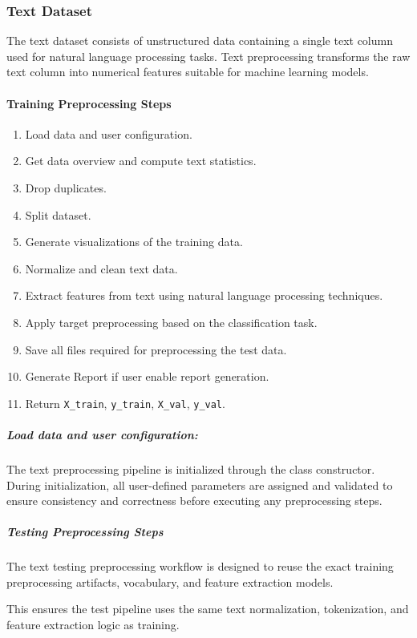 \subsubsection{Text Dataset}

The text dataset consists of unstructured data containing a single text column used for natural language processing tasks. Text preprocessing transforms the raw text column into numerical features suitable for machine learning models.
\vspace{0.5cm}

\paragraph{Training Preprocessing Steps}

\begin{enumerate}
  \item Load data and user configuration.
  \item Get data overview and compute text statistics.
  \item Drop duplicates.
  \item Split dataset.
  \item Generate visualizations of the training data.
  \item Normalize and clean text data.
  \item Extract features from text using natural language processing techniques.
  \item Apply target preprocessing based on the classification task.
  \item Save all files required for preprocessing the test data.
  \item Generate Report if user enable report generation.
  \item Return \texttt{X\_train}, \texttt{y\_train}, \texttt{X\_val}, \texttt{y\_val}.
\end{enumerate}

\vspace{5cm}

\subparagraph{Load data and user configuration:}
The text preprocessing pipeline is initialized through the class constructor. During initialization, all user-defined parameters are assigned and validated to ensure consistency and correctness before executing any preprocessing steps.

\vspace{0.3cm}


\subparagraph{Testing Preprocessing Steps}

The text testing preprocessing workflow is designed to reuse the exact training preprocessing artifacts, vocabulary, and feature extraction models.



This ensures the test pipeline uses the same text normalization, tokenization, and feature extraction logic as training.

